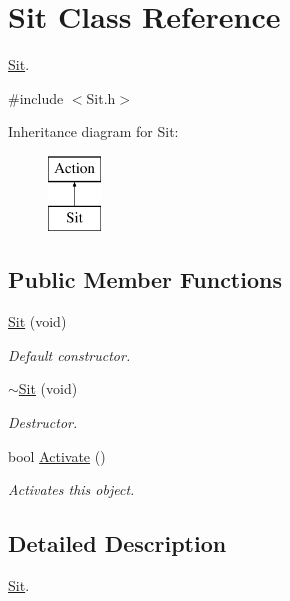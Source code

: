 \hypertarget{class_sit}{\section{Sit Class Reference}
\label{class_sit}
}


\hyperlink{class_sit}{Sit}.  




{\ttfamily \#include $<$Sit.\-h$>$}

Inheritance diagram for Sit\-:\begin{figure}[H]
\begin{center}
\leavevmode
\includegraphics[height=2.000000cm]{class_sit}
\end{center}
\end{figure}
\subsection*{Public Member Functions}
\begin{DoxyCompactItemize}
\item 
\hyperlink{class_sit_a723bf2d8326e2f7fc15f2d938904652a}{Sit} (void)
\begin{DoxyCompactList}\small\item\em Default constructor. \end{DoxyCompactList}\item 
\hyperlink{class_sit_a3b37cc97f31c83b69734bfb2ef66cf00}{$\sim$\-Sit} (void)
\begin{DoxyCompactList}\small\item\em Destructor. \end{DoxyCompactList}\item 
bool \hyperlink{class_sit_a6aa8e20622ce327550627cf0050cb3e6}{Activate} ()
\begin{DoxyCompactList}\small\item\em Activates this object. \end{DoxyCompactList}\end{DoxyCompactItemize}


\subsection{Detailed Description}
\hyperlink{class_sit}{Sit}. 

